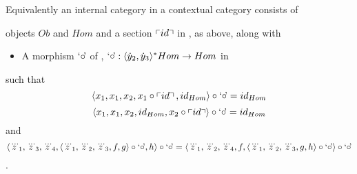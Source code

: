 \begin{lemma}
Equivalently an internal category in a contextual category \catc consists of
\item objects $Ob$ and  $Hom$  and a section $\left\ulcorner id\right\urcorner$ in \catc,  as above, along with
\begin{itemize}
\item A morphism $\text{`$\circ$\kern-2pt'}$ of \catc, $\text{`$\circ$\kern-2pt'}: \langle\dot y_2,\dot y_3\rangle^*Hom \rightarrow Hom$ in \catc
\end{itemize}
such that
\begin{equation}
\label{leftidentityrepresentation2}
\tuple{x_1,x_1,x_2,x_1\circ \fid,id_{Hom}} \circ \compmorph =id_{Hom}
\end{equation}
\begin{equation}
\label{rightidentityrepresentation2}
\tuple{x_1,x_1,x_2,id_{Hom},x_2 \circ \fid} \circ \compmorph =id_{Hom}
\end{equation}
and
\begin{equation}
\label{associativityrepresentation2}
\assocequivalentlhs = \assocequivalentrhs
\end{equation}.
\end{lemma}

